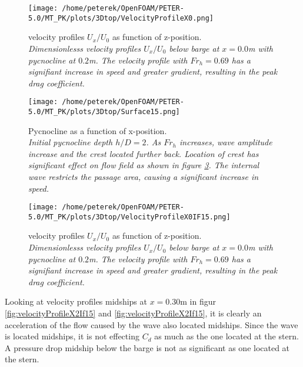 \documentclass[a4paper, 12pt]{report}
\begin{document}
\vspace{2ex}
\begin{minipage}[t]{.45\textwidth}
	\begin{figure}[H]
		\centering
		\texttt{[image: /home/peterek/OpenFOAM/PETER-5.0/MT\_PK/plots/3Dtop/VelocityProfileX0.png]}
		\caption{velocity profiles $U_x/U_0$ as function of z-position. \\ \textit{Dimensionlesss velocity profiles $U_x/U_0$ below barge at $x = 0.0$m with pycnocline at $0.2$m. The velocity profile with $Fr_h = 0.69$ has a signifiant increase in speed and greater gradient, resulting in the peak drag coefficient.}}
		\label{fig:velocityProfileX0}
	\end{figure}
\end{minipage}\hfill
\vspace{2ex}
\begin{minipage}[t]{.45\textwidth} 
	\begin{figure}[H]
		\centering
		\texttt{[image: /home/peterek/OpenFOAM/PETER-5.0/MT\_PK/plots/3Dtop/Surface15.png]}
		\caption{Pycnocline as a function of x-position. \\ \textit{Initial pycnocline depth $h/D=2$. As $Fr_h$ increases, wave amplitude increase and the crest located further back. Location of crest has significant effect on flow field as shown in figure \ref{fig:velocityProfileX0If15}. The internal wave restricts the passage area, causing a significant increase in speed.}}
		\label{fig:eta2}
	\end{figure}
\end{minipage}\hfill
\vspace{2ex}
\begin{minipage}[t]{.45\textwidth}
	\begin{figure}[H]
		\centering
		\texttt{[image: /home/peterek/OpenFOAM/PETER-5.0/MT\_PK/plots/3Dtop/VelocityProfileX0IF15.png]}
		\caption{velocity profiles $U_x/U_0$ as function of z-position. \\ \textit{Dimensionlesss velocity profiles $U_x/U_0$ below barge at $x = 0.0$m with pycnocline at $0.2$m. The velocity profile with $Fr_h = 0.69$ has a signifiant increase in speed and greater gradient, resulting in the peak drag coefficient.}}
		\label{fig:velocityProfileX0If15}
	\end{figure}
\end{minipage}\hfill
\vspace{2ex}
\newpage
Looking at velocity profiles midships at $x=0.30$m in figur \ref{fig:velocityProfileX2If15} and \ref{fig:velocityProfileX2If15}, it is clearly an acceleration of the flow caused by the wave also located midships. Since the wave is located midships, it is not effecting $C_d$ as much as the one located at the stern. A pressure drop midship below the barge is not as significant as one located at the stern.
\end{document}
